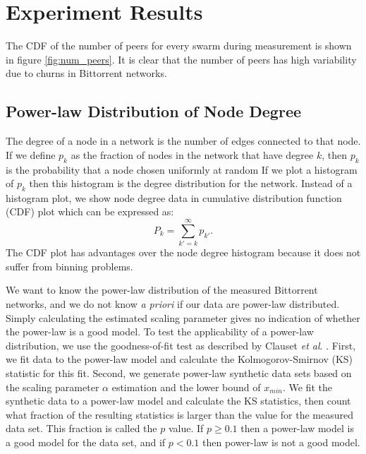 \documentclass[paper]{ieice}
\begin{document}
\section{Experiment Results}\label{result}
The CDF of the number of peers for every swarm during measurement is shown in figure \ref{fig:num_peers}. 
It is clear that the number of peers has  high variability due to churns in Bittorrent networks. 

\subsection{Power-law Distribution of Node Degree}
The degree of a node in a network is the number of edges connected to that node. 
If we define $p_k$ as the  fraction of nodes in the network that have degree $k$, then $p_k$ is the probability that a node chosen uniformly at random %
If we plot a histogram of $p_k$ then this histogram is the degree distribution for  the network. 
Instead of a histogram plot,  we show node degree data in cumulative distribution  function (CDF) plot which can be expressed as:
\begin{equation}
P_k = \sum_{k'=k}^{\infty} p_{k'}.
\end{equation}
The CDF plot has advantages over the node degree histogram because it does not suffer from binning problems.  %

We want to know the power-law distribution of the measured Bittorrent networks, and we do not know \textit{a priori} if our data are power-law distributed.
Simply calculating the estimated scaling parameter gives no indication of whether the power-law is a good model.  
To test the applicability of a power-law distribution, we use the goodness-of-fit test as described by Clauset \textit{et al}. \cite{clauset2009power}. 
First, we fit data to the power-law model and calculate the Kolmogorov-Smirnov (KS) statistic for this fit. 
Second, we generate power-law synthetic data sets based on the scaling parameter $\alpha$ estimation and the lower bound of $x_{min}$. 
We fit the synthetic data to a power-law model and calculate the KS statistics, then count what fraction of the resulting statistics is larger than the value for the measured data set. 
This fraction is called the $p$ value.  
If $p \geq 0.1$ then a power-law model is a good model for the data set, and if $p < 0.1$ then power-law is not a good model.
\end{document}
